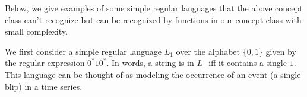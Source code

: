     Below, we give examples of some simple regular languages that the above concept class can't recognize but can be recognized by functions in our concept class with small complexity. 
  \iffalse
        \begin{theorem}
        $\mathsf{PARITY}$ cannot be represented by the concept class in \eqref{eqn:AL_concept_class}.
    \end{theorem}
\begin{proof} \emph{(sketch.)} For strings in $w \in \{0, 1\}^j$, we can rewrite \eqref{eqn:AL_concept_class_simplified} as 
        \begin{equation*}
        F^{\ast (j)}\left(\mathbf{x}\right)(w) =  \sum_{i : i < j} \alpha_i(w_i),
    \end{equation*}
where each $(\alpha_i(0), \alpha_i(1)) \in \Reals^2$ is any two-dimensional vector. Thus, $F^{\ast (j)}\left(\mathbf{x}\right)(w)$
can be written as a \emph{linear} function of $w$. It is easy to show and well-known that linear functions have correlation $0$ with $\mathsf{PARITY}$ \cite{odonnell} (this requires a standard linear change in parametrization to functions over $\{-1,1\}^j$ with output also in $\{-1,1\}$). 
\end{proof}
\fi

We first consider a simple regular language $L_1$ over the alphabet $\{0,1\}$ given by the regular expression $0^\ast 10^\ast$. In words, a string is in $L_1$ iff it contains a single $1$. This language can be thought of as modeling the occurrence of an event (a single blip) in a time series.

